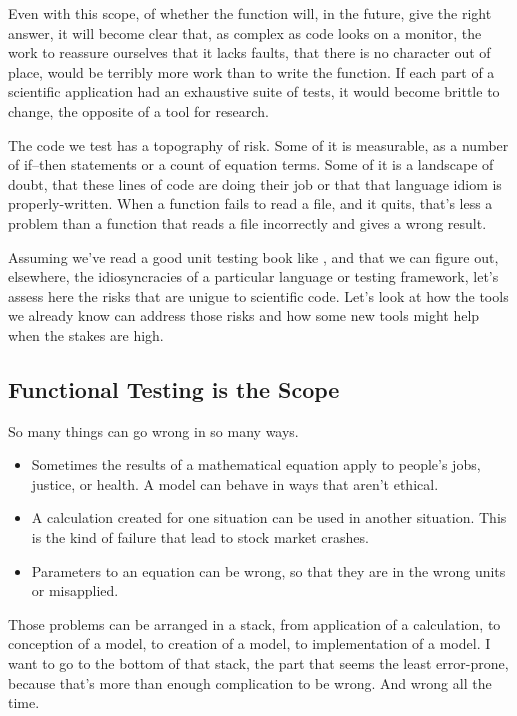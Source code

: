 \documentclass[fleqn,10pt]{olplainarticle}
\begin{document}
Even with this scope, of whether the function will, in the future,
give the right answer, it will become clear that, as complex as
code looks on a monitor, the work to reassure ourselves that it lacks
faults, that there is no character out of place, would be terribly more
work than to write the function. If each part of a scientific application
had an exhaustive suite of tests, it would become brittle to change,
the opposite of a tool for research.

The code we test has a topography of risk. Some of it is measurable,
as a number of if--then statements or a count of equation terms.
Some of it is a landscape of doubt, that these lines of code are
doing their job or that that language idiom is properly-written.
When a function fails to read a file, and it quits, that's less
a problem than a function that reads a file incorrectly and gives
a wrong result.

Assuming we've read a good unit testing book like \cite{jorgensen2013},
and that we can figure out, elsewhere, the idiosyncracies of a
particular language or testing framework,
let's assess here the risks that are unigue to scientific code.
Let's look at how the tools we already know can address those risks
and how some new tools might help when the stakes are high.


\subsection{Functional Testing is the Scope}

So many things can go wrong in so many ways.
\begin{itemize}
    \item Sometimes the results of a mathematical equation apply to people's jobs, justice, or health. A model can behave in ways that aren't ethical.
    \item A calculation created for one situation can be used in another situation. This is the kind of failure that lead to stock market crashes.
    \item Parameters to an equation can be wrong, so that they are in the wrong units or misapplied.
\end{itemize}
Those problems can be arranged in a stack, from application of a calculation, to conception of a model, to creation of a model, to implementation of a model. I want to go to the bottom of that stack, the part that seems the least error-prone, because that's more than enough complication to be wrong. And wrong all the time.
\end{document}

